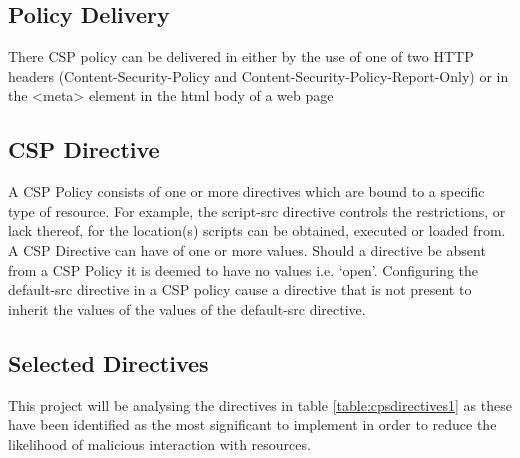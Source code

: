 \documentclass{mscreport}
\begin{document}
\subsection{Policy Delivery}
There CSP policy can be delivered in either by the use of one of two HTTP headers (Content-Security-Policy and Content-Security-Policy-Report-Only) or in the <meta> element in the html body of a web page

\subsection{CSP Directive}
A CSP Policy consists of one or more directives which are bound to a specific type of resource. For example, the script-src directive controls the restrictions, or lack thereof, for the location(s) scripts can be obtained, executed or loaded from. A CSP Directive can have of one or more values.
Should a directive be absent from a CSP Policy it is deemed to have no values i.e. ‘open’. Configuring the default-src directive in a CSP policy cause a directive that is not present to inherit the values of the values of the default-src directive.

\subsection{Selected Directives}
This project will be analysing the directives in table \ref{table:cpsdirectives1} as these have been identified as the most significant to implement in order to reduce the likelihood of malicious interaction with resources.
\end{document}
